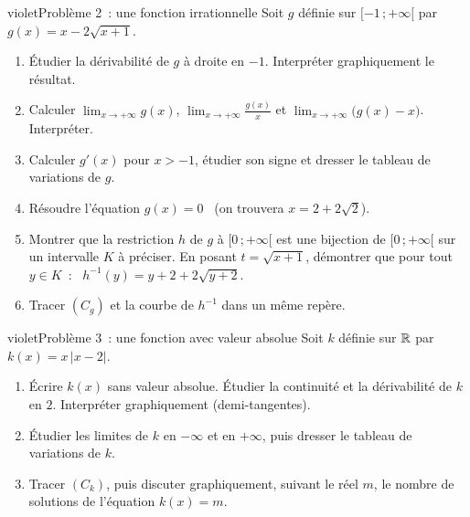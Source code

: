 \begin{exo}{violet}{Problème 2~: une fonction irrationnelle }
Soit $g$ définie sur $[-1\,;+\infty[$ par \ $g(x)=x-2\sqrt{x+1}$.
\begin{enumerate}
  \item Étudier la dérivabilité de $g$ à droite en $-1$. Interpréter graphiquement le résultat.
  \item Calculer $\displaystyle\lim_{x\to+\infty}g(x)$, $\displaystyle\lim_{x\to+\infty}\frac{g(x)}{x}$ et $\displaystyle\lim_{x\to+\infty}\big(g(x)-x\big)$. Interpréter.
  \item Calculer $g'(x)$ pour $x>-1$, étudier son signe et dresser le tableau de variations de $g$.
  \item Résoudre l'équation $g(x)=0$ \ (on trouvera $x=2+2\sqrt2$).
  \item Montrer que la restriction $h$ de $g$ à $[0\,;+\infty[$ est une bijection de $[0\,;+\infty[$ sur un intervalle $K$ à préciser. En posant $t=\sqrt{x+1}$, démontrer que pour tout $y\in K$~: \ $h^{-1}(y)=y+2+2\sqrt{y+2}$.
  \item Tracer $(C_g)$ et la courbe de $h^{-1}$ dans un même repère.
\end{enumerate}
\end{exo}
\begin{exo}{violet}{Problème 3~: une fonction avec valeur absolue }
Soit $k$ définie sur $\mathbb{R}$ par $k(x)=x\,|x-2|$.
\begin{enumerate}
  \item Écrire $k(x)$ sans valeur absolue. Étudier la continuité et la dérivabilité de $k$ en $2$. Interpréter graphiquement (demi-tangentes).
  \item Étudier les limites de $k$ en $-\infty$ et en $+\infty$, puis dresser le tableau de variations de $k$.
  \item Tracer $(C_k)$, puis discuter graphiquement, suivant le réel $m$, le nombre de solutions de l'équation $k(x)=m$.
\end{enumerate}
\end{exo}


